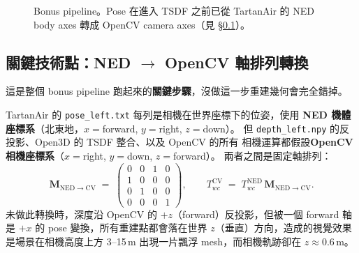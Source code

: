 \documentclass[11pt,a4paper]{article}
\begin{document}
\begin{figure}[H]\centering
  \caption{Bonus pipeline。Pose 在進入 TSDF 之前已從 TartanAir 的 NED body
  axes 轉成 OpenCV camera axes（見 §\ref{sec:bonus-pose}）。}
  \label{fig:bonus-pipeline}
\end{figure}

\subsection{關鍵技術點：NED $\to$ OpenCV 軸排列轉換}
\label{sec:bonus-pose}
這是整個 bonus pipeline 跑起來的\textbf{關鍵步驟}，沒做這一步重建幾何會完全錯掉。

TartanAir 的 \texttt{pose\_left.txt} 每列是相機在世界座標下的位姿，使用
\textbf{NED 機體座標系}（北東地，$x{=}$forward, $y{=}$right, $z{=}$down）。
但 \texttt{depth\_left.npy} 的反投影、Open3D 的 TSDF 整合、以及 OpenCV 的所有
相機運算都假設\textbf{OpenCV 相機座標系}（$x{=}$right, $y{=}$down, $z{=}$forward）。
兩者之間是固定軸排列：
\begin{equation}
  \mathbf{M}_{\mathrm{NED}\to\mathrm{CV}} \;=\;
  \begin{pmatrix}
    0 & 0 & 1 & 0 \\
    1 & 0 & 0 & 0 \\
    0 & 1 & 0 & 0 \\
    0 & 0 & 0 & 1
  \end{pmatrix},
  \qquad
  T^{\mathrm{CV}}_{\!wc} \;=\; T^{\mathrm{NED}}_{\!wc}\,\mathbf{M}_{\mathrm{NED}\to\mathrm{CV}}.
  \label{eq:ned2cv}
\end{equation}
未做此轉換時，深度沿 OpenCV 的 $+z$（forward）反投影，但被一個 forward 軸是
$+x$ 的 pose 變換，所有重建點都會落在世界 $z$（垂直）方向，造成的視覺效果
是場景在相機高度上方 3--15\,m 出現一片飄浮 mesh，而相機軌跡卻在 $z\approx0.6\,\mathrm{m}$。
\end{document}

